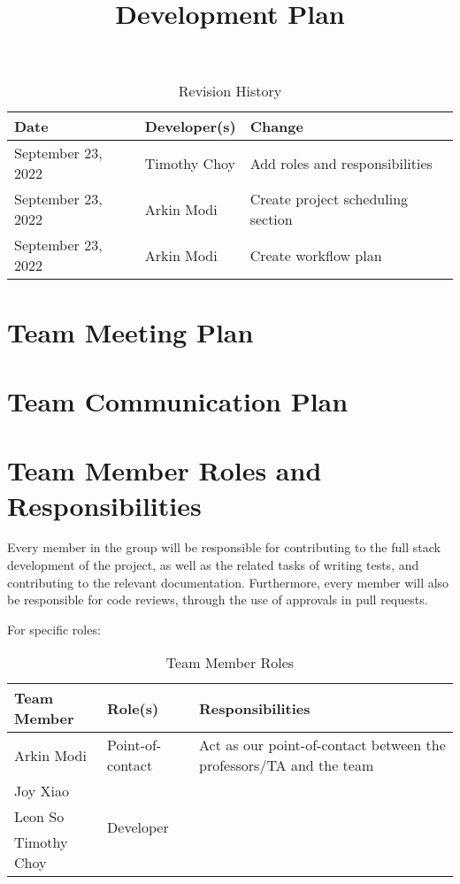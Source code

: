 \documentclass{article}
\title{Development Plan\\\progname}
\author{\authname}
\date{}
\begin{document}
\begin{table}[hp]
\caption{Revision History} \label{TblRevisionHistory}
\begin{tabularx}{\textwidth}{llX}
\toprule
\textbf{Date} & \textbf{Developer(s)} & \textbf{Change}\\
\midrule
September 23, 2022 & Timothy Choy & Add roles and responsibilities\\
September 23, 2022 & Arkin Modi & Create project scheduling section\\
September 23, 2022 & Arkin Modi & Create workflow plan\\
\bottomrule
\end{tabularx}
\end{table}

\newpage

\maketitle


\section{Team Meeting Plan}

\section{Team Communication Plan}

\section{Team Member Roles and Responsibilities}

Every member in the group will be responsible for contributing to the full stack 
development of the project, as well as the related tasks of writing tests, and 
contributing to the relevant documentation. Furthermore, every member will also 
be responsible for code reviews, through the use of approvals in pull requests. 

For specific roles:
\begin{table}
	\centering
	\caption{Team Member Roles}
	\vspace{5pt}
	\begin{tabular}{l|l|l}
		Team Member & Role(s) & Responsibilities \\ \hline
		Arkin Modi & Point-of-contact & Act as our point-of-contact between the 
		professors/TA and the team \\
		Joy Xiao & \multirow{3}{*}{Developer} & \\
		Leon So & & \\
		Timothy Choy & & \\
	\end{tabular}
\end{table}
\end{document}
